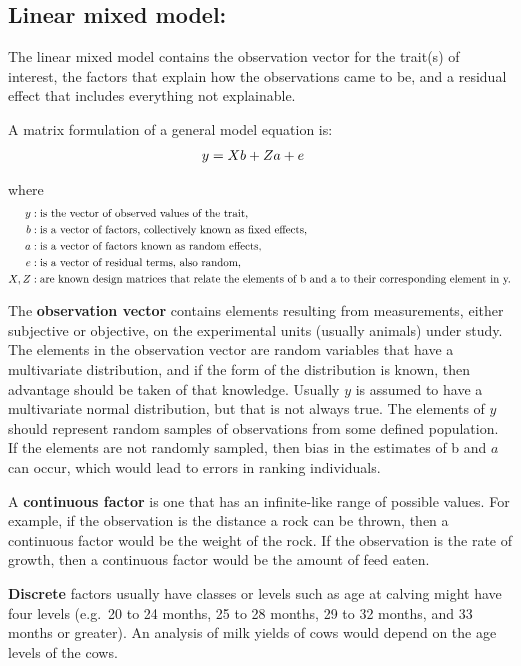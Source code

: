 \documentclass[
]{book}
\begin{document}
\hypertarget{linear-mixed-model}{%
\subsection{Linear mixed model:}\label{linear-mixed-model}}

The linear mixed model contains the observation vector for the trait(s) of interest, the
factors that explain how the observations came to be, and a residual effect that includes
everything not explainable.

A matrix formulation of a general model equation is:
\begin{align}
y &= Xb + Za + e \notag
\end{align}

where
\begin{align}
y &: \text{is the vector of observed values of the trait,} \notag \\
b &: \text{is a vector of factors, collectively known as fixed effects,} \notag \\
a &: \text{is a vector of factors known as random effects,} \notag \\
e &: \text{is a vector of residual terms, also random,} \notag \\
X,Z &: \text{are known design matrices that relate the elements of b and a to their corresponding element in y.} \notag 
\end{align}

The \textbf{observation vector} contains elements resulting from measurements, either subjective
or objective, on the experimental units (usually animals) under study. The elements in
the observation vector are random variables that have a multivariate distribution, and if
the form of the distribution is known, then advantage should be taken of that knowledge.
Usually \(y\) is assumed to have a multivariate normal distribution, but that is not always
true. The elements of \(y\) should represent random samples of observations from some defined
population. If the elements are not randomly sampled, then bias in the estimates of b and
\(a\) can occur, which would lead to errors in ranking individuals.

A \textbf{continuous factor} is one that has an infinite-like range of
possible values. For example, if the observation is the distance a rock can be thrown,
then a continuous factor would be the weight of the rock. If the observation is the
rate of growth, then a continuous factor would be the amount of feed eaten.

\textbf{Discrete} factors usually have classes or levels such as age at calving might have four
levels (e.g.~20 to 24 months, 25 to 28 months, 29 to 32 months, and 33 months or
greater). An analysis of milk yields of cows would depend on the age levels of the
cows.
\end{document}
